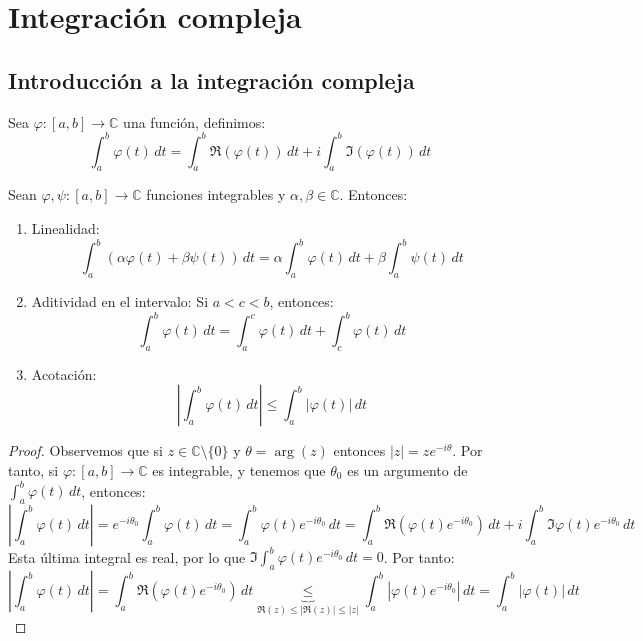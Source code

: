 \section{Integración compleja}\label{sec:integracion-compleja}
\subsection{Introducción a la integración compleja}

\begin{definición}
    Sea $\varphi: [a, b] \to \mathbb{C}$ una función, definimos:
    \[
    \int_a^b \varphi(t) \, dt = \int_a^b \Re (\varphi(t)) \, dt + i \int_a^b \Im (\varphi(t)) \, dt
    \]
\end{definición}

\begin{proposición}
    Sean $\varphi, \psi: [a, b] \to \mathbb{C}$ funciones integrables y $\alpha, \beta \in \mathbb{C}$. Entonces:
    \begin{enumerate}
        \item Linealidad:
        \[
        \int_a^b (\alpha\varphi(t) + \beta\psi(t)) \, dt = 
        \alpha\int_a^b \varphi(t) \, dt + \beta\int_a^b \psi(t) \, dt
        \]
        \item Aditividad en el intervalo: Si $a < c < b$, entonces:
        \[
        \int_a^b \varphi(t) \, dt = \int_a^c \varphi(t) \, dt + \int_c^b \varphi(t) \, dt
        \]
        \item Acotación:
        \[
        \left| \int_a^b \varphi(t) \, dt \right| \leq 
        \int_a^b |\varphi(t)| \, dt
        \]
    \end{enumerate}
\end{proposición}

\begin{proof}
    Observemos que si $z \in \mathbb{C} \setminus \{0\}$ y $\theta = \arg(z)$ entonces $|z| = z e^{-i\theta}$. Por tanto, si $\varphi: [a, b] \to \mathbb{C}$ es integrable, y tenemos que $\theta_0$ es un argumento de $\int_a^b \varphi(t) \, dt$, entonces:
    \[
    \left| \int_a^b \varphi(t) \, dt \right| =
    e^{-i\theta_0} \int_a^b \varphi(t) \, dt =
    \int_a^b \varphi(t) e^{-i\theta_0} \, dt =
    \int_a^b \Re(\varphi(t) e^{-i\theta_0}) \, dt + i \int_a^b \Im \varphi(t) e^{-i\theta_0} \, dt
    \]
    Esta última integral es real, por lo que $\Im \int_a^b \varphi(t) e^{-i\theta_0} \, dt = 0$. Por tanto:
    \[
    \left| \int_a^b \varphi(t) \, dt \right| =
    \int_a^b \Re(\varphi(t) e^{-i\theta_0}) \, dt 
    \underbrace{\leq}_{\Re (z) \leq |\Re (z)| \leq |z|}
    \int_a^b |\varphi(t) e^{-i\theta_0}| \, dt =
    \int_a^b |\varphi(t)| \, dt
    \]
\end{proof}

